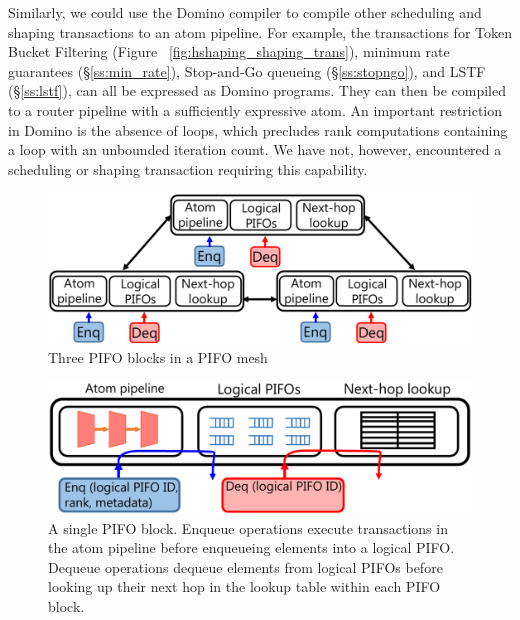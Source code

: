 Similarly, we could use the Domino compiler to compile other scheduling and
shaping transactions to an atom pipeline.  For example, the transactions for
Token Bucket Filtering (Figure ~\ref{fig:hshaping_shaping_trans}), minimum rate
guarantees (\S\ref{ss:min_rate}), Stop-and-Go queueing (\S\ref{ss:stopngo}),
and LSTF (\S\ref{ss:lstf}), can all be expressed as Domino programs. They can
then be compiled to a router pipeline with a sufficiently expressive
atom. An important restriction in Domino is the absence of loops, which
precludes rank computations containing a loop with an unbounded iteration
count. We have not, however, encountered a scheduling or shaping transaction
requiring this capability.

\begin{figure}[!t]
  \centering
  \includegraphics[width=0.6\columnwidth]{pifo_pifo_mesh.pdf}
  \caption{Three PIFO blocks in a PIFO mesh}
  \label{fig:mesh}
\end{figure}

\begin{figure}[!t]
  \centering
  \includegraphics[width=0.6\columnwidth]{pifo_pifo_block.pdf}
  \caption{A single PIFO block. Enqueue operations execute transactions in the
atom pipeline before enqueueing elements into a logical PIFO. Dequeue operations
dequeue elements from logical PIFOs before looking up their next hop in the
lookup table within each PIFO block.} 
  \label{fig:block}
\end{figure}

